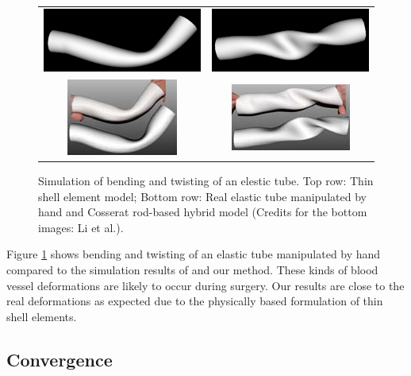 \begin{figure}[tbh]
    \centering
    \begin{tabular}{cc}
     \includegraphics[width=0.3\columnwidth]{img/compare-bend.png}
      &
      \includegraphics[width=0.3\columnwidth]{img/compare-twist.png}
      \\
      \includegraphics[width=0.3\columnwidth]{img/compare-bend-other.png}
      &
      \includegraphics[width=0.3\columnwidth]{img/compare-twist-other.png}
    \end{tabular}
    \caption{Simulation of bending and twisting of an elestic tube. Top row: Thin shell element model; Bottom row: Real elastic tube manipulated by hand and Cosserat rod-based hybrid model \cite{Li2009} (Credits for the bottom images: Li et al.).}
    \label{fig-deformations}
\end{figure}

Figure \ref{fig-deformations} shows bending and twisting of an elastic tube manipulated by hand compared to the simulation results of \cite{Li2009} and our method. These kinds of blood vessel deformations are likely to occur during surgery. Our results are close to the real deformations as expected due to the physically based formulation of thin shell elements.

\subsection{Convergence}

